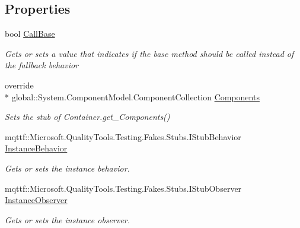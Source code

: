 \subsection*{Properties}
\begin{DoxyCompactItemize}
\item 
bool \hyperlink{class_system_1_1_component_model_1_1_fakes_1_1_stub_container_a2f95b468857c1c143ce558c842fd6c5e}{Call\-Base}
\begin{DoxyCompactList}\small\item\em Gets or sets a value that indicates if the base method should be called instead of the fallback behavior\end{DoxyCompactList}\item 
override \\*
global\-::\-System.\-Component\-Model.\-Component\-Collection \hyperlink{class_system_1_1_component_model_1_1_fakes_1_1_stub_container_a54d15e0b28f58532103ff25c3832a8c5}{Components}
\begin{DoxyCompactList}\small\item\em Sets the stub of Container.\-get\-\_\-\-Components()\end{DoxyCompactList}\item 
mqttf\-::\-Microsoft.\-Quality\-Tools.\-Testing.\-Fakes.\-Stubs.\-I\-Stub\-Behavior \hyperlink{class_system_1_1_component_model_1_1_fakes_1_1_stub_container_ac36184c8146e0c7ba223cbdd13912f45}{Instance\-Behavior}
\begin{DoxyCompactList}\small\item\em Gets or sets the instance behavior.\end{DoxyCompactList}\item 
mqttf\-::\-Microsoft.\-Quality\-Tools.\-Testing.\-Fakes.\-Stubs.\-I\-Stub\-Observer \hyperlink{class_system_1_1_component_model_1_1_fakes_1_1_stub_container_a8fac830a6a1b1565888da1491e9cf997}{Instance\-Observer}
\begin{DoxyCompactList}\small\item\em Gets or sets the instance observer.\end{DoxyCompactList}\end{DoxyCompactItemize}


